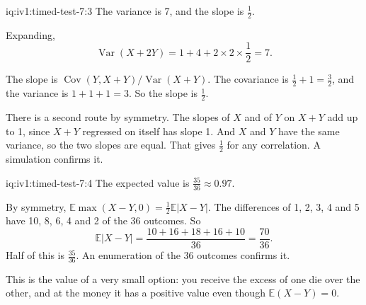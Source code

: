 \begin{solution}{iq:iv1:timed-test-7:3}
The variance is 7, and the slope is $\frac12$.

Expanding,
\[
\operatorname{Var}(X + 2Y) = 1 + 4 + 2 \times 2 \times \frac12 = 7.
\]

The slope is $\operatorname{Cov}(Y, X + Y)/\operatorname{Var}(X + Y)$. The covariance is $\frac12 + 1 = \frac32$, and the variance is $1 + 1 + 1 = 3$. So the slope is $\frac12$.

There is a second route by symmetry. The slopes of $X$ and of $Y$ on $X + Y$ add up to 1, since $X + Y$ regressed on itself has slope 1. And $X$ and $Y$ have the same variance, so the two slopes are equal. That gives $\frac12$ for any correlation. A simulation confirms it.

\end{solution}

\begin{solution}{iq:iv1:timed-test-7:4}
The expected value is $\frac{35}{36} \approx 0.97$.

By symmetry, $\mathbb{E}\max(X - Y, 0) = \frac12\mathbb{E}|X - Y|$. The differences of 1, 2, 3, 4 and 5 have 10, 8, 6, 4 and 2 of the 36 outcomes. So
\[
\mathbb{E}|X - Y| = \frac{10 + 16 + 18 + 16 + 10}{36} = \frac{70}{36}.
\]
Half of this is $\frac{35}{36}$. An enumeration of the 36 outcomes confirms it.

This is the value of a very small option: you receive the excess of one die over the other, and at the money it has a positive value even though $\mathbb{E}(X - Y) = 0$.


\end{solution}

